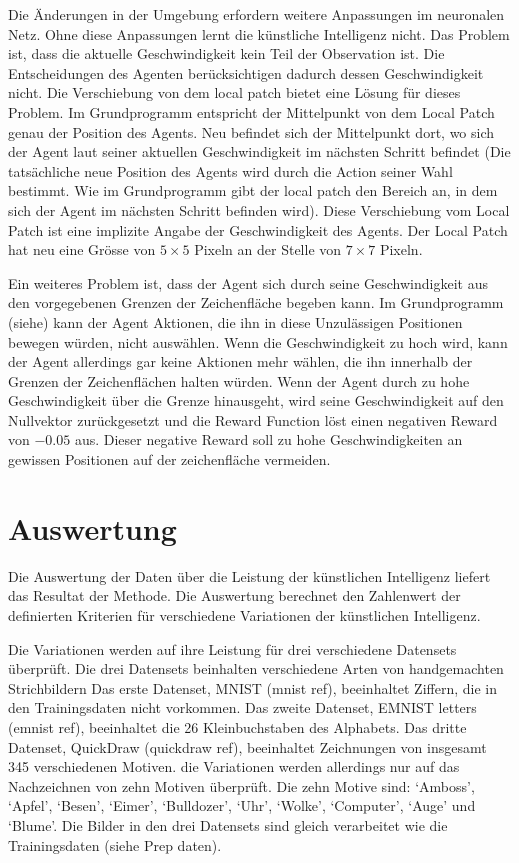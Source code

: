 Die Änderungen in der Umgebung erfordern weitere Anpassungen im neuronalen Netz.
Ohne diese Anpassungen lernt die künstliche Intelligenz nicht. Das Problem ist,
dass die aktuelle Geschwindigkeit kein Teil der Observation ist. Die
Entscheidungen des Agenten berücksichtigen dadurch dessen Geschwindigkeit nicht.
Die Verschiebung von dem local patch bietet eine Lösung für dieses Problem. Im
Grundprogramm entspricht der Mittelpunkt von dem Local Patch genau der Position
des Agents. Neu befindet sich der Mittelpunkt dort, wo sich der Agent laut
seiner aktuellen Geschwindigkeit im nächsten Schritt befindet (Die tatsächliche
neue Position des Agents wird durch die Action seiner Wahl bestimmt. Wie im
Grundprogramm gibt der local patch den Bereich an, in dem sich der Agent im
nächsten Schritt befinden wird). Diese Verschiebung vom Local Patch ist eine
implizite Angabe der Geschwindigkeit des Agents. Der Local Patch hat neu eine
Grösse von $5\times5$ Pixeln an der Stelle von $7\times7$ Pixeln.


Ein weiteres Problem ist, dass der Agent sich durch seine Geschwindigkeit aus
den vorgegebenen Grenzen der Zeichenfläche begeben kann. Im Grundprogramm  
(siehe) kann der Agent Aktionen, die ihn in diese Unzulässigen Positionen  %
bewegen würden, nicht auswählen. Wenn die Geschwindigkeit zu hoch wird, kann der
Agent allerdings gar keine Aktionen mehr wählen, die ihn innerhalb der Grenzen der
Zeichenflächen halten würden. Wenn der Agent durch zu hohe Geschwindigkeit über
die Grenze hinausgeht, wird seine Geschwindigkeit auf den Nullvektor
zurückgesetzt und die Reward Function löst einen negativen Reward von $-0.05$
aus. Dieser negative Reward soll zu hohe Geschwindigkeiten an gewissen
Positionen auf der zeichenfläche vermeiden.


\section{Auswertung}
Die Auswertung der Daten über die Leistung der künstlichen Intelligenz liefert
das Resultat der Methode. Die Auswertung berechnet den Zahlenwert der
definierten Kriterien für verschiedene Variationen der künstlichen Intelligenz.

Die Variationen werden auf ihre Leistung für drei verschiedene Datensets
überprüft. Die drei Datensets beinhalten verschiedene Arten von handgemachten
Strichbildern Das erste Datenset, MNIST (mnist ref),  beeinhaltet Ziffern, die
in den Trainingsdaten nicht vorkommen. Das zweite Datenset, EMNIST letters
(emnist ref), beeinhaltet die 26 Kleinbuchstaben des Alphabets. Das dritte
Datenset, QuickDraw (quickdraw ref), beeinhaltet Zeichnungen von insgesamt 345
verschiedenen Motiven. die Variationen werden allerdings nur auf das
Nachzeichnen von zehn Motiven überprüft. Die zehn Motive sind: `Amboss',
`Apfel', `Besen', `Eimer', `Bulldozer', `Uhr', `Wolke', `Computer', `Auge' und
`Blume'. Die Bilder in den drei Datensets sind gleich verarbeitet wie die
Trainingsdaten (siehe Prep daten). 

